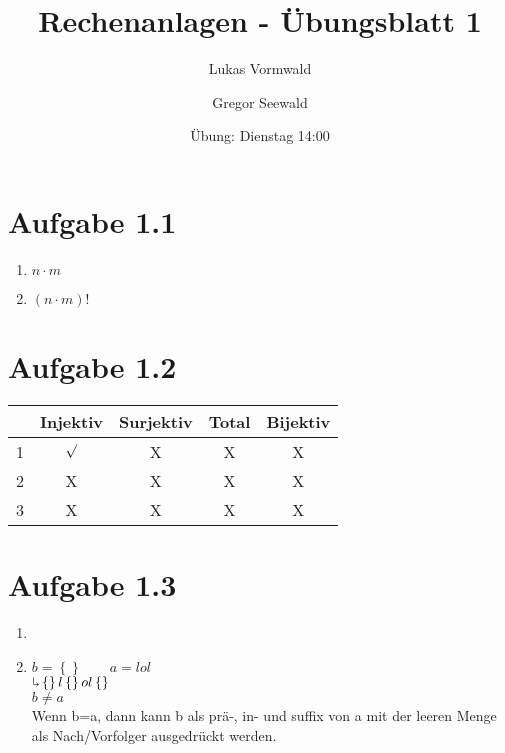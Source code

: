 \documentclass[11pt,a4paper]{article}
\title{Rechenanlagen - Übungsblatt 1}
\author{Lukas Vormwald \and Gregor Seewald}
\date{Übung: Dienstag 14:00}
\begin{document}
\maketitle
	\section*{Aufgabe 1.1}
		\begin{enumerate}
			\item $n\cdot m$
			\item $\left( n \cdot m \right)!$
		\end{enumerate}
	\section*{Aufgabe 1.2}
	\begin{tabular}{|c|c|c|c|c|}
	\hline 
	 & Injektiv & Surjektiv & Total & Bijektiv \\ 
	\hline 
	1 & $\surd$ & X & X & X \\ 
	\hline 
	2 & X & X & X & X \\
	\hline
	3 & X & X & X & X \\
	\hline  
	\end{tabular} 
	\section*{Aufgabe 1.3}
	\begin{enumerate}
		\item
		\item 	$b=\left\lbrace \right\rbrace \qquad a=lol$\\
				$\rotatebox[origin=c]{180}{$\Lsh$}  \left\lbrace\right\rbrace l\left\lbrace\right\rbrace ol\left\lbrace\right\rbrace$\\
				$b \neq a$\\
				Wenn b=a, dann kann b als prä-, in- und suffix von a mit der leeren Menge als Nach/Vorfolger ausgedrückt werden. 
	\end{enumerate}
\end{document}
